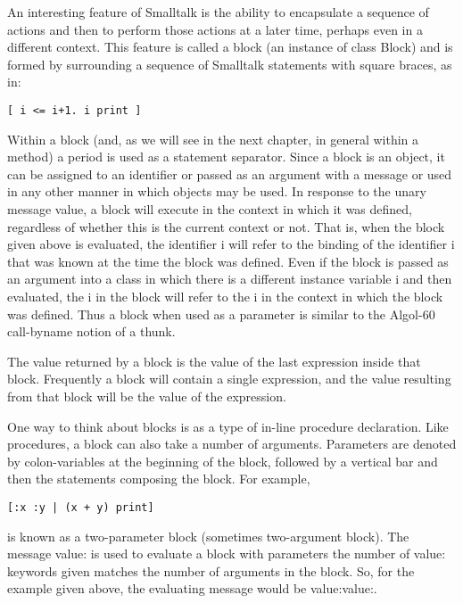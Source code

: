 
An interesting feature of Smalltalk is the ability to encapsulate a sequence
of actions and then to perform those actions at a later time, perhaps even
in a different context. This feature is called a block (an instance of class
Block) and is formed by surrounding a sequence of Smalltalk statements
with square braces, as in:
\begin{lstlisting}
[ i <= i+1. i print ]
\end{lstlisting}

Within a block (and, as we will see in the next chapter, in general
within a method) a period is used as a statement separator. Since a block
is an object, it can be assigned to an identifier or passed as an argument
with a message or used in any other manner in which objects may be used.
In response to the unary message value, a block will execute in the context
in which it was defined, regardless of whether this is the current context
or not. That is, when the block given above is evaluated, the identifier i
will refer to the binding of the identifier i that was known at the time the
block was defined. Even if the block is passed as an argument into a class
in which there is a different instance variable i and then evaluated, the i
in the block will refer to the i in the context in which the block was defined.
Thus a block when used as a parameter is similar to the Algol-60 call-byname notion of a thunk.

The value returned by a block is the value of the last expression inside
that block. Frequently a block will contain a single expression, and the
value resulting from that block will be the value of the expression.

One way to think about blocks is as a type of in-line procedure declaration. Like procedures, a block can also take a number of arguments.
Parameters are denoted by colon-variables at the beginning of the block,
followed by a vertical bar and then the statements composing the block.
For example,
\begin{lstlisting}
[:x :y | (x + y) print]
\end{lstlisting}
is known as a two-parameter block (sometimes two-argument block). The
message value: is used to evaluate a block with parameters the number of
value: keywords given matches the number of arguments in the block. So,
for the example given above, the evaluating message would be value:value:.
